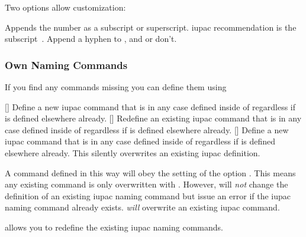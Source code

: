 \documentclass[load-preamble+]{cnltx-doc}
\begin{document}
Two options allow customization:
\begin{options}
    Appends the number as a subscript or superscript.  \ac{iupac}
    recommendation is the subscript~\cite{iupac:redbook}.
    Append a hyphen to ,  and  or don't.
\end{options}

\subsubsection{Own Naming Commands}

If you find any commands missing you can define them using
\begin{commands}
  []
    Define a new \ac{iupac} command that is in any case
    defined inside of  regardless if  is defined elsewhere
    already.
  []
    Redefine an existing \ac{iupac} command that is in any case defined inside
    of  regardless if  is defined elsewhere already.
  []
    Define a new \ac{iupac} command that is in any case
    defined inside of  regardless if  is defined elsewhere
    already.  This silently overwrites an existing \ac{iupac} definition.
\end{commands}
A command defined in this way will obey the setting of the option
.  This means any existing command is only overwritten with
.  However,  will \emph{not} change the
definition of an existing \ac{iupac} naming command but issue an error if the
\ac{iupac} naming command already exists.   \emph{will}
overwrite an existing \ac{iupac} command.
\begin{example}
  \NewChemIUPAC{}
  \RenewChemIUPAC{}
\end{example}

 allows you to redefine the existing \ac{iupac} naming
commands.
\begin{example}
   \par
  \RenewChemIUPAC{}
\end{example}
\end{document}
